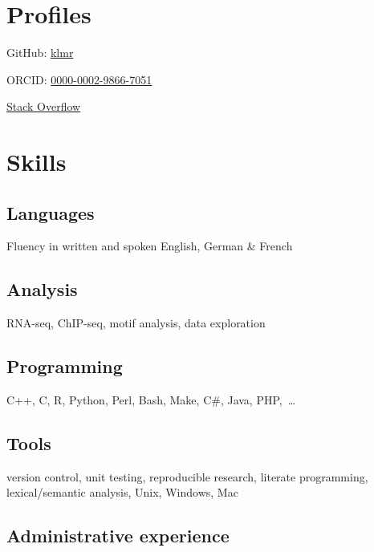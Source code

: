 \documentclass{klmr-cv}
\newcommand*\csharp{C\#}
\newcommand*\cpp{C++}
\begin{document}
\date{2003}
\item{}

\section{Profiles}

\item{GitHub: \href{http://github.com/klmr}{klmr}}
\item{ORCID: \href{http://orcid.org/0000-0002-9866-7051}{0000-0002-9866-7051}}
\item{\href{http://stackoverflow.com/users/1968/konrad-rudolph}{Stack Overflow}}

\section{Skills}

\subsection{Languages}

\item{Fluency in written and spoken English, German \& French}

\subsection{Analysis}

\item{RNA-seq, ChIP-seq, motif analysis, data exploration}

\subsection{Programming}

\item{\cpp, C, R, Python, Perl, Bash, Make, \csharp, Java, PHP,~…}

\subsection{Tools}

\item{version control, unit testing, reproducible research, literate
    programming, lexical/semantic analysis, Unix, Windows, Mac}

\subsection{Administrative experience}
\end{document}

